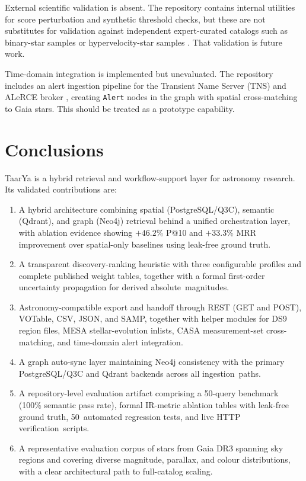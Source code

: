 \documentclass[12pt]{elsarticle}
\begin{document}
External scientific validation is absent. The repository contains internal utilities for score perturbation and synthetic threshold checks, but these are not substitutes for validation against independent expert-curated catalogs such as binary-star samples \citep{ElBadry2021} or hypervelocity-star samples \citep{Brown2015}. That validation is future work.

Time-domain integration is implemented but unevaluated. The repository includes an alert ingestion pipeline for the Transient Name Server (TNS) and ALeRCE broker \citep{Forster2021}, creating \texttt{Alert} nodes in the graph with spatial cross-matching to Gaia stars. This should be treated as a prototype capability.

\section{Conclusions}
\label{sec:conclusions}

\textsf{TaarYa} is a hybrid retrieval and workflow-support layer for astronomy research. Its validated contributions are:

\begin{enumerate}
    \item A hybrid architecture combining spatial (PostgreSQL/Q3C), semantic (Qdrant), and graph (Neo4j) retrieval behind a unified orchestration layer, with ablation evidence showing $+46.2\%$ P@10 and $+33.3\%$ MRR improvement over spatial-only baselines using leak-free ground truth.
    \item A transparent discovery-ranking heuristic with three configurable profiles and complete published weight tables, together with a formal first-order uncertainty propagation for derived absolute~magnitudes.
    \item Astronomy-compatible export and handoff through REST (GET and POST), VOTable, CSV, JSON, and SAMP, together with helper modules for DS9 region files, MESA stellar-evolution inlists, CASA measurement-set cross-matching, and time-domain alert integration.
    \item A graph auto-sync layer maintaining Neo4j consistency with the primary PostgreSQL/Q3C and Qdrant backends across all ingestion~paths.
    \item A repository-level evaluation artifact comprising a 50-query benchmark (100\% semantic pass rate), formal IR-metric ablation tables with leak-free ground truth, 50~automated regression tests, and live HTTP verification~scripts.
    \item A representative evaluation corpus of \nStarsReal{} stars from Gaia DR3 spanning \nClusterNodes{} sky regions and covering diverse magnitude, parallax, and colour distributions, with a clear architectural path to full-catalog scaling.
\end{enumerate}
\end{document}
